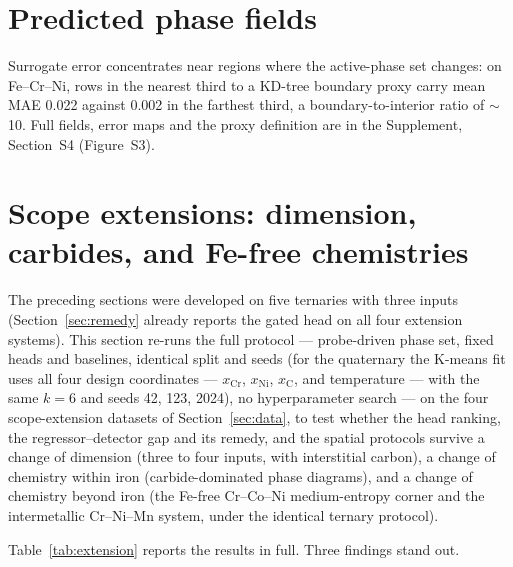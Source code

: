 \documentclass[preprint,12pt,authoryear]{elsarticle}
\begin{document}
\section{Predicted phase fields}
\label{sec:fields}

Surrogate error concentrates near regions where the active-phase set
changes: on Fe--Cr--Ni, rows in the nearest third to a KD-tree boundary
proxy carry mean MAE 0.022 against 0.002 in the farthest third, a
boundary-to-interior ratio of $\sim$10. Full fields, error maps and the
proxy definition are in the Supplement, Section~S4 (Figure~S3).

\section{Scope extensions: dimension, carbides, and Fe-free chemistries}
\label{sec:extensions}

The preceding sections were developed on five ternaries with three
inputs (Section~\ref{sec:remedy} already reports the gated head on all
four extension systems). This section re-runs the full protocol --- probe-driven
phase set, fixed heads and baselines, identical split and seeds (for the
quaternary the K-means fit uses all four design coordinates ---
$x_{\mathrm{Cr}}$, $x_{\mathrm{Ni}}$, $x_{\mathrm{C}}$, and temperature ---
with the same $k = 6$ and seeds 42, 123, 2024), no hyperparameter search
--- on the four scope-extension datasets of
Section~\ref{sec:data}, to test whether the head ranking, the
regressor--detector gap and its remedy, and the spatial protocols
survive a change of dimension (three to four inputs, with interstitial
carbon), a change of chemistry within iron (carbide-dominated phase
diagrams), and a change of chemistry beyond iron (the Fe-free Cr--Co--Ni
medium-entropy corner and the intermetallic Cr--Ni--Mn system, under the
identical ternary protocol).

Table~\ref{tab:extension} reports the results in full. Three findings
stand out.
\end{document}
